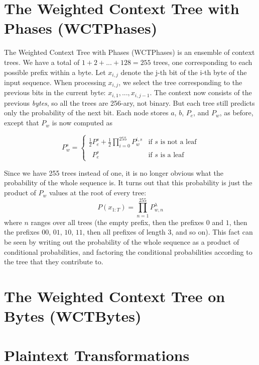 \documentclass[11pt]{scrartcl}
\begin{document}
\section{The Weighted Context Tree with Phases (WCTPhases)}

The Weighted Context Tree with Phases (WCTPhases) is an ensemble of context
trees. We have a total of $1 + 2 + ... + 128 = 255$ trees, one corresponding to
each possible prefix within a byte. Let $x_{i,j}$ denote the j-th bit of the
i-th byte of the input sequence.  When processing $x_{i,j}$, we select the tree
corresponding to the previous bits in the current byte: $x_{i,1}, ...,
x_{i,j-1}$. The context now consists of the previous {\em bytes}, so all the
trees are 256-ary, not binary. But each tree still predicts only the
probability of the next bit. Each node stores $a$, $b$, $P_e$, and $P_w$, as
before, except that $P_w$ is now computed as

\[
P_w^s =
\left\{
\begin{array}{ll}
\frac{1}{2} P_e^s + \frac{1}{2} \prod_{i=0}^{255}{ P_w^{i,s} }
    & \mbox{if $s$ is not a leaf} \\
\phantom{\frac{1}{2}} P_e^s
    & \mbox{if $s$ is a leaf}
\end{array}
\right.
\]

Since we have 255 trees instead of one, it is no longer obvious what the
probability of the whole sequence is. It turns out that this probability is
just the product of $P_w$ values at the root of every tree:
\[
P(x_{1:T}) = \prod_{n=1}^{255} P_{w, n}^\lambda
\]
where $n$ ranges over all trees (the empty prefix, then the prefixes $0$ and
$1$, then the prefixes $00$, $01$, $10$, $11$, then all prefixes of length 3,
and so on). This fact can be seen by writing out the probability of the whole
sequence as a product of conditional probabilities, and factoring the
conditional probabilities according to the tree that they contribute to.


\section{The Weighted Context Tree on Bytes (WCTBytes)}


\section{Plaintext Transformations}
\end{document}

